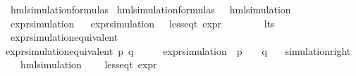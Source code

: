\begin{isabellebody}
\isanewline
{}\isamarkupfalse%
\ hml{\isacharunderscore}{\kern0pt}simulation{\isacharunderscore}{\kern0pt}formulas\ \isanewline
{\isachardoublequoteopen}hml{\isacharunderscore}{\kern0pt}simulation{\isacharunderscore}{\kern0pt}formulas\ {\isasymequiv}\ {\isacharbraceleft}{\kern0pt}{\isasymphi}{\isachardot}{\kern0pt}\ hml{\isacharunderscore}{\kern0pt}simulation\ {\isasymphi}{\isacharbraceright}{\kern0pt}{\isachardoublequoteclose}\isanewline
\isanewline
{}\isamarkupfalse%
\ expr{\isacharunderscore}{\kern0pt}simulation\isanewline
\ \ \isanewline
{\isachardoublequoteopen}expr{\isacharunderscore}{\kern0pt}simulation\ {\isacharequal}{\kern0pt}\ {\isacharbraceleft}{\kern0pt}{\isasymphi}{\isachardot}{\kern0pt}\ {\isacharparenleft}{\kern0pt}less{\isacharunderscore}{\kern0pt}eq{\isacharunderscore}{\kern0pt}t\ {\isacharparenleft}{\kern0pt}expr\ {\isasymphi}{\isacharparenright}{\kern0pt}\ {\isacharparenleft}{\kern0pt}{\isasyminfinity}{\isacharcomma}{\kern0pt}\ {\isasyminfinity}{\isacharcomma}{\kern0pt}\ {\isasyminfinity}{\isacharcomma}{\kern0pt}\ {\isasyminfinity}{\isacharcomma}{\kern0pt}\ {}{\isacharcomma}{\kern0pt}\ {}{\isacharparenright}{\kern0pt}{\isacharparenright}{\kern0pt}{\isacharbraceright}{\kern0pt}{\isachardoublequoteclose}\isanewline
\isanewline
{}\isamarkupfalse%
\ lts\isanewline
{}\isanewline
\isanewline
{}\isamarkupfalse%
\ expr{\isacharunderscore}{\kern0pt}simulation{\isacharunderscore}{\kern0pt}equivalent\isanewline
\ \ \isanewline
{\isachardoublequoteopen}expr{\isacharunderscore}{\kern0pt}simulation{\isacharunderscore}{\kern0pt}equivalent\ p\ q\ {\isasymequiv}\ {\isacharparenleft}{\kern0pt}{\isasymforall}\ {\isasymphi}{\isachardot}{\kern0pt}\ {\isasymphi}\ {\isasymin}\ expr{\isacharunderscore}{\kern0pt}simulation\ {\isasymlongrightarrow}\ {\isacharparenleft}{\kern0pt}p\ {\isasymTurnstile}\ {\isasymphi}{\isacharparenright}{\kern0pt}\ {\isasymlongleftrightarrow}\ {\isacharparenleft}{\kern0pt}q\ {\isasymTurnstile}\ {\isasymphi}{\isacharparenright}{\kern0pt}{\isacharparenright}{\kern0pt}{\isachardoublequoteclose}\isanewline
{}\isamarkupfalse%
\isanewline
\isanewline
{}\isamarkupfalse%
\ simulation{\isacharunderscore}{\kern0pt}right{\isacharcolon}{\kern0pt}\isanewline
\ \ \ {\isachardoublequoteopen}hml{\isacharunderscore}{\kern0pt}simulation\ {\isasymphi}{\isachardoublequoteclose}\isanewline
\ \ \ {\isachardoublequoteopen}{\isacharparenleft}{\kern0pt}less{\isacharunderscore}{\kern0pt}eq{\isacharunderscore}{\kern0pt}t\ {\isacharparenleft}{\kern0pt}expr\ {\isasymphi}{\isacharparenright}{\kern0pt}\ {\isacharparenleft}{\kern0pt}{\isasyminfinity}{\isacharcomma}{\kern0pt}\ {\isasyminfinity}{\isacharcomma}{\kern0pt}\ {\isasyminfinity}{\isacharcomma}{\kern0pt}\ {\isasyminfinity}{\isacharcomma}{\kern0pt}\ {}{\isacharcomma}{\kern0pt}\ {}{\isacharparenright}{\kern0pt}{\isacharparenright}{\kern0pt}{\isachardoublequoteclose}\isanewline

\end{isabellebody}
